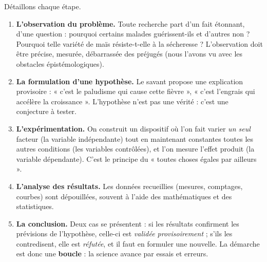\documentclass[11pt]{article}
\newcommand{\cle}[1]{{\popxbold\color{popdark}#1}}
\begin{document}
Détaillons chaque étape.

\begin{enumerate}
\item \textbf{L'observation du problème.} Toute recherche part d'un fait étonnant, d'une question : pourquoi certains malades guérissent-ils et d'autres non ? Pourquoi telle variété de maïs résiste-t-elle à la sécheresse ? L'observation doit être précise, mesurée, débarrassée des préjugés (nous l'avons vu avec les obstacles épistémologiques).
\item \textbf{La formulation d'une hypothèse.} Le savant propose une explication provisoire : « c'est le paludisme qui cause cette fièvre », « c'est l'engrais qui accélère la croissance ». L'hypothèse n'est pas une vérité : c'est une conjecture à tester.
\item \textbf{L'expérimentation.} On construit un dispositif où l'on fait varier \emph{un seul} facteur (la \cle{variable indépendante}) tout en maintenant constantes toutes les autres conditions (les \cle{variables contrôlées}), et l'on mesure l'effet produit (la \cle{variable dépendante}). C'est le principe du « toutes choses égales par ailleurs ».
\item \textbf{L'analyse des résultats.} Les données recueillies (mesures, comptages, courbes) sont dépouillées, souvent à l'aide des mathématiques et des statistiques.
\item \textbf{La conclusion.} Deux cas se présentent : si les résultats confirment les prévisions de l'hypothèse, celle-ci est \emph{validée provisoirement} ; s'ils les contredisent, elle est \emph{réfutée}, et il faut en formuler une nouvelle. La démarche est donc une \textbf{boucle} : la science avance par essais et erreurs.
\end{enumerate}
\end{document}
